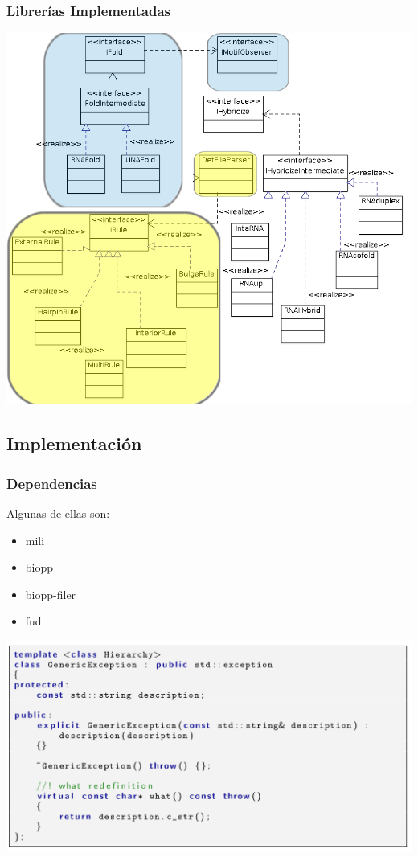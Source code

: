       \begin{frame}\frametitle{\textbf{Librerías Implementadas}}
        \begin{center}
          \includegraphics[scale=.3]{images/fideoInterface5.png}
        \end{center}
      \end{frame} 

  \subsection{Implementación} 
      \begin{frame}
        \frametitle{\textbf{Dependencias}}
        \begin{block}{Algunas de ellas son:}
          \begin{itemize}
            \item mili
            \item biopp 
            \item biopp-filer
            \item fud
          \end{itemize}  
        \end{block}          
        \hspace*{1.7cm}\includegraphics[scale=.18]{images/exampleMili.png}
      \end{frame}    
      
